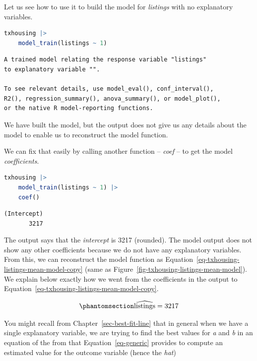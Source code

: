 \documentclass[
  12pt,
  letterpaper,
  DIV=11,
  numbers=noendperiod]{scrreprt}
\begin{document}
Let us see how to use it to build the model for \emph{listings} with no
explanatory variables.

\begin{lstlisting}[language=R]
txhousing |>
    model_train(listings ~ 1)
\end{lstlisting}

\begin{lstlisting}
A trained model relating the response variable "listings"
to explanatory variable "".

To see relevant details, use model_eval(), conf_interval(),
R2(), regression_summary(), anova_summary(), or model_plot(),
or the native R model-reporting functions.
\end{lstlisting}

We have built the model, but the output does not give us any details
about the model to enable us to reconstruct the model function.

We can fix that easily by calling another function -- \emph{coef} -- to
get the model \emph{coefficients}.

\begin{lstlisting}[language=R]
txhousing |>
    model_train(listings ~ 1) |>
    coef()
\end{lstlisting}

\begin{lstlisting}
(Intercept) 
       3217 
\end{lstlisting}

The output says that the \emph{intercept} is 3217 (rounded). The model
output does not show any other coefficients because we do not have any
explanatory variables. From this, we can reconstruct the model function
as Equation~\ref{eq-txhousing-listings-mean-model-copy} (same as
Figure~\ref{fig-txhousing-listings-mean-model}). We explain below
exactly how we went from the coefficients in the output to
Equation~\ref{eq-txhousing-listings-mean-model-copy}.

\begin{equation}\phantomsection\label{eq-txhousing-listings-mean-model-copy}{
\widehat{\text{listings}} = 3217
}\end{equation}

You might recall from Chapter~\ref{sec-best-fit-line} that in general
when we have a single explanatory variable, we are trying to find the
best values for \emph{a} and \emph{b} in an equation of the from that
Equation~\ref{eq-generic} provides to compute an estimated value for the
outcome variable (hence the \emph{hat})
\end{document}
